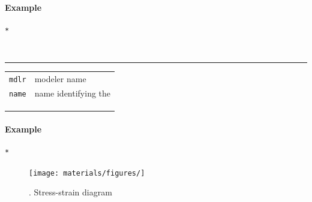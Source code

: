 \paragraph{Example}
\begin{verbatim}
*
\end{verbatim}






\subsection{}
\noindent 
\begin{verbatim}

\end{verbatim}
\vspace{-10pt}
{\color{grayLines} \rule{\linewidth}{0.25pt}}
\begin{center}
\begin{tabular}{lp{10cm}}
{\tt mdlr} & modeler name \\
{\tt name} & name identifying the \\
{\tt } &  \\
{\tt } &  \\
{\tt } &  \\
\end{tabular}
\end{center}
\paragraph{Example}
\begin{verbatim}
*
\end{verbatim}

\begin{figure}[h]
\centering
\texttt{[image: materials/figures/]}
\caption{. Stress-strain diagram}\label{}
\end{figure}
